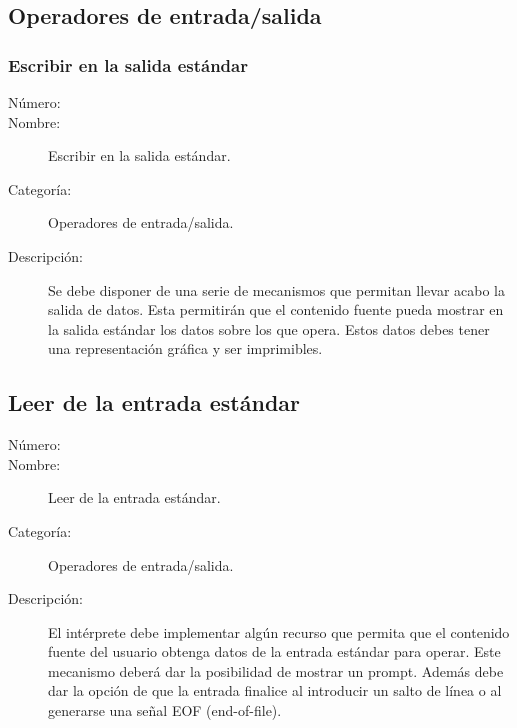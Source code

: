 \subsection{Operadores de entrada/salida}

\subsubsection{Escribir en la salida estándar}
\begin{framed}
	\begin{description}
		\item [Número:] \cn
		\item [Nombre:] Escribir en la salida estándar.
		\item [Categoría:] Operadores de entrada/salida.
		\item [Descripción:] Se debe disponer de una serie de mecanismos que permitan llevar acabo la salida de datos. Esta permitirán que el contenido fuente pueda mostrar en la salida estándar los datos sobre los que opera. Estos datos
		debes tener una representación gráfica y ser imprimibles.  
	\end {description}
\end{framed}

\subsection{Leer de la entrada estándar}
\begin{framed}
	\begin{description}
		\item [Número:] \cn
		\item [Nombre:] Leer de la entrada estándar.
		\item [Categoría:] Operadores de entrada/salida.
		\item [Descripción:] El intérprete debe implementar algún recurso que permita que el contenido fuente del usuario
		obtenga datos de la entrada estándar para operar. Este mecanismo deberá dar la posibilidad de mostrar un prompt.
		Además debe dar la opción de que la entrada finalice al introducir un salto de línea o al generarse una señal EOF (end-of-file).
	\end {description}
\end{framed}
